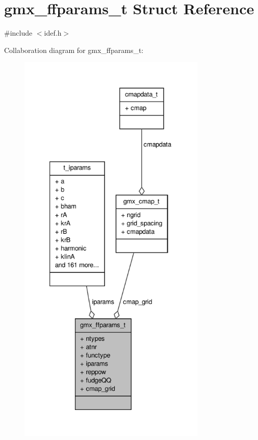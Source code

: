 \hypertarget{structgmx__ffparams__t}{\section{gmx\-\_\-ffparams\-\_\-t \-Struct \-Reference}
\label{structgmx__ffparams__t}
}


{\ttfamily \#include $<$idef.\-h$>$}



\-Collaboration diagram for gmx\-\_\-ffparams\-\_\-t\-:
\nopagebreak
\begin{figure}[H]
\begin{center}
\leavevmode
\includegraphics[height=550pt]{structgmx__ffparams__t__coll__graph}
\end{center}
\end{figure}
